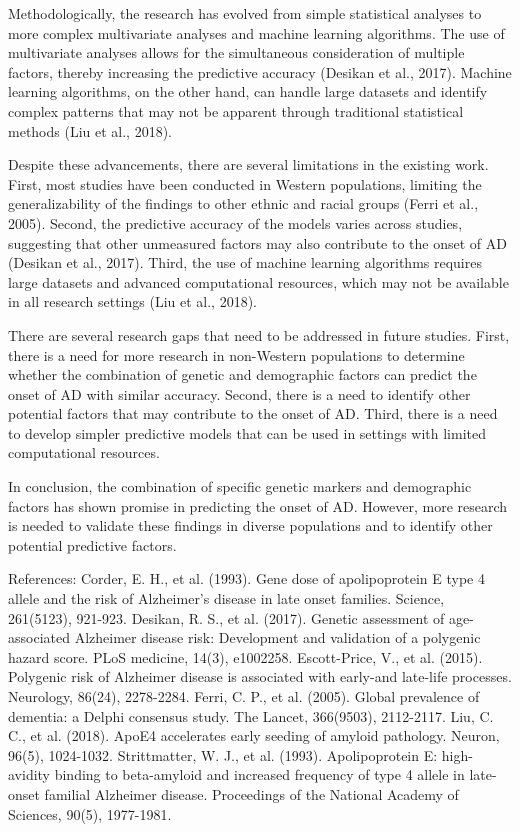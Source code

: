 \documentclass[conference]{IEEEtran}
\begin{document}
Methodologically, the research has evolved from simple statistical analyses to more complex multivariate analyses and machine learning algorithms. The use of multivariate analyses allows for the simultaneous consideration of multiple factors, thereby increasing the predictive accuracy (Desikan et al., 2017). Machine learning algorithms, on the other hand, can handle large datasets and identify complex patterns that may not be apparent through traditional statistical methods (Liu et al., 2018).

Despite these advancements, there are several limitations in the existing work. First, most studies have been conducted in Western populations, limiting the generalizability of the findings to other ethnic and racial groups (Ferri et al., 2005). Second, the predictive accuracy of the models varies across studies, suggesting that other unmeasured factors may also contribute to the onset of AD (Desikan et al., 2017). Third, the use of machine learning algorithms requires large datasets and advanced computational resources, which may not be available in all research settings (Liu et al., 2018).

There are several research gaps that need to be addressed in future studies. First, there is a need for more research in non-Western populations to determine whether the combination of genetic and demographic factors can predict the onset of AD with similar accuracy. Second, there is a need to identify other potential factors that may contribute to the onset of AD. Third, there is a need to develop simpler predictive models that can be used in settings with limited computational resources.

In conclusion, the combination of specific genetic markers and demographic factors has shown promise in predicting the onset of AD. However, more research is needed to validate these findings in diverse populations and to identify other potential predictive factors.

References:
Corder, E. H., et al. (1993). Gene dose of apolipoprotein E type 4 allele and the risk of Alzheimer's disease in late onset families. Science, 261(5123), 921-923.
Desikan, R. S., et al. (2017). Genetic assessment of age-associated Alzheimer disease risk: Development and validation of a polygenic hazard score. PLoS medicine, 14(3), e1002258.
Escott-Price, V., et al. (2015). Polygenic risk of Alzheimer disease is associated with early-and late-life processes. Neurology, 86(24), 2278-2284.
Ferri, C. P., et al. (2005). Global prevalence of dementia: a Delphi consensus study. The Lancet, 366(9503), 2112-2117.
Liu, C. C., et al. (2018). ApoE4 accelerates early seeding of amyloid pathology. Neuron, 96(5), 1024-1032.
Strittmatter, W. J., et al. (1993). Apolipoprotein E: high-avidity binding to beta-amyloid and increased frequency of type 4 allele in late-onset familial Alzheimer disease. Proceedings of the National Academy of Sciences, 90(5), 1977-1981.
\end{document}
